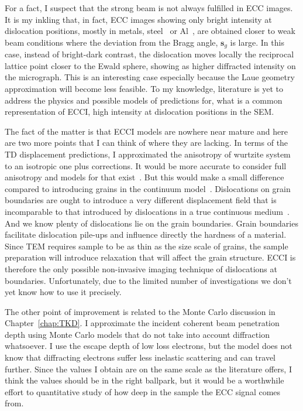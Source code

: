 For a fact, I suspect that the strong beam is not always fulfilled in ECC images. It is my inkling that, in fact, ECC images showing only bright intensity at dislocation positions, mostly in metals, \eg steel~\cite{Gutierrez09} or Al~\cite{Barnoush10}, are obtained closer to weak beam conditions where the deviation from the Bragg angle, $\mathbf{s}_g$ is large. In this case, instead of bright-dark contrast, the dislocation moves locally the reciprocal lattice point closer to the Ewald sphere, showing as higher diffracted intensity on the micrograph. This is an interesting case especially because the Laue geometry approximation will become less feasible. To my knowledge, literature is yet to address the physics and possible models of predictions for, what is a common representation of ECCI, high intensity at dislocation positions in the SEM. 

The fact of the matter is that ECCI models are nowhere near mature and here are two more points that I can think of where they are lacking. In terms of the TD displacement predictions, I approximated the anisotropy of wurtzite system to an isotropic one plus corrections. It would be more accurate to consider full anisotropy and models for that exist~\cite{Barnett71}. But this would make a small difference  compared to introducing grains in the continuum model~\cite{Read50}. Dislocations on grain boundaries are ought to introduce a very different displacement field that is incomparable to that introduced by dislocations in a true continuous medium~\cite{Van02}. And we know plenty of dislocations lie on the grain boundaries. Grain boundaries facilitate dislocation pile-ups and influence directly the hardness of a material. Since TEM requires sample to be as thin as the size scale of grains, the sample preparation will introduce relaxation that will affect the grain structure. ECCI is therefore the only possible non-invasive imaging technique of dislocations at boundaries. Unfortunately, due to the limited number of  investigations we don't yet know how to use it precisely.

The other point of improvement is related to the Monte Carlo discussion in Chapter~\ref{chap:TKD}. I approximate the incident coherent beam penetration depth using Monte Carlo models that do not take into account diffraction whatsoever. I use the escape depth of low loss electrons, but the model does not know that diffracting electrons suffer less inelastic scattering and can travel further. Since the values I obtain are on the same scale as the literature offers, I think the values should be in the right ballpark, but it would be a worthwhile effort to quantitative study of how deep in the sample the ECC signal comes from.

